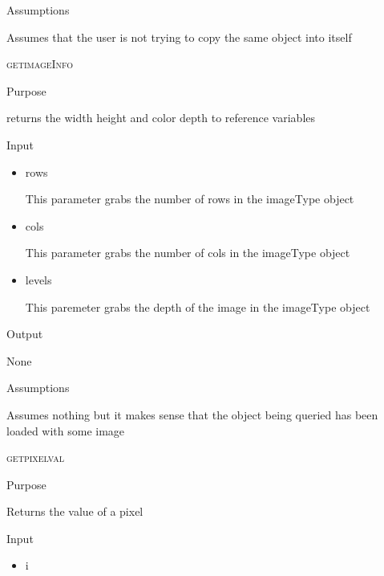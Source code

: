 \documentclass[pdftex, 11pt]{article}
\begin{document}
\begin{description}
\begin{description}
			\item{Assumptions}

				Assumes that the user is not trying to copy the same
				object into itself


		\end{description}


	\item{\textsc{getimageInfo}}
		\begin{description}
			\item{Purpose}
			
 				returns the width height and color depth 
				to reference variables

			\item{Input}

				\begin{itemize}
					\item{rows}

						This parameter grabs the number of rows
						in the imageType object

					\item{cols}

						This parameter grabs the number of cols
						in the imageType object

					\item{levels}

						This paremeter grabs the depth of the
						image in the imageType object

				\end{itemize}

			\item{Output}

				None

			\item{Assumptions}

				Assumes nothing but it makes sense that the object being
				queried has been loaded with some image


		\end{description}


	\item{\textsc{getpixelval}}
		\begin{description}
			\item{Purpose}

				Returns the value of a pixel

			\item{Input}

				\begin{itemize}

					\item{i}
					

\end{itemize}
\end{description}
\end{description}
\end{document}
